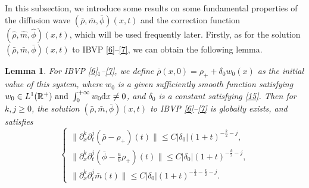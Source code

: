 \documentclass[11pt]{article}
\theoremstyle{plain}
\newtheorem{lemma}{Lemma}[section]
\numberwithin{equation}{section}
\begin{document}
In this subsection, we introduce some results on some fundamental properties of the diffusion wave $(\bar{\rho},\bar{m}, \bar\phi)(x,t)$ and the correction function $(\hat{\rho},\hat{m},\hat\phi)(x,t)$, which will be used frequently later.
Firstly, as for the solution $(\bar{\rho},\bar{m}, \bar\phi)(x,t)$ to IBVP \eqref{6}--\eqref{7}, we can obtain the following lemma.
\begin{lemma}\label{l3.1}
 For IBVP \eqref{6}$_1$--\eqref{7}, we define $\bar{\rho}(x,0)=\rho_{+}+\delta_{0}w_0(x)$ as the initial value of this system, where $w_{0}$ is a given sufficiently smooth function satisfying  $w_{0}\in L^{1}(\mathbb{R}^{+})~ \mbox{and} ~\int_{0}^{+\infty}w_{0} {\rm d}x\neq0$, and $\delta_{0}$ is a constant satisfying \eqref{15}.
 Then for $k,j\geq 0$, the solution $(\bar{\rho},\bar{m}, \bar\phi)(x,t)$ to IBVP \eqref{6}--\eqref{7}  is 
 globally exists, and satisfies
\begin{equation}\label{3.15}
 \left\{\begin{array}{l}
\|\partial^{k}_{x}\partial^{j}_{t}(\bar{\rho}-\rho_{+})(t)\|\leq C|\delta_{0}|(1+t)^{-\frac{k}{2}-j},\\[2mm]
\|\partial^{k}_{x}\partial^{j}_{t}(\bar{\phi}-\frac{a}{b}\rho_{+})(t)\|\leq C|\delta_{0}|(1+t)^{-\frac{k}{2}-j},\\[2mm]
\|\partial^{k}_{x}\partial^{j}_{t}\bar{m}(t)\|\leq C|\delta_{0}|(1+t)^{-\frac{1}{2}-\frac{k}{2}-j}.
  \end{array}\right.
\end{equation}
\end{lemma}
\end{document}
